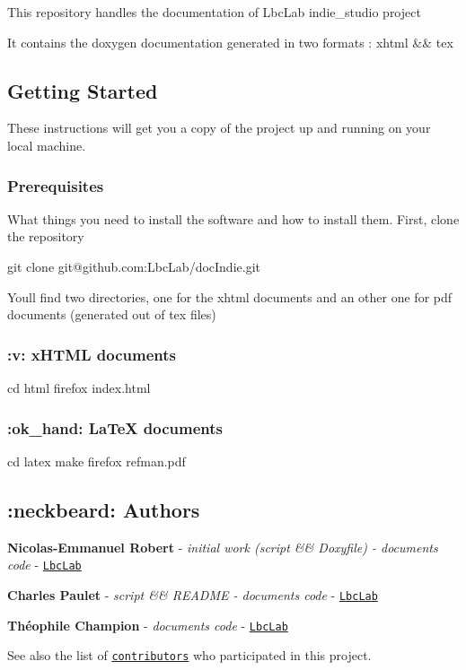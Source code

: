 This repository handles the documentation of Lbc\+Lab indie\+\_\+studio project

It contains the doxygen documentation generated in two formats \+: xhtml \&\& tex

\subsection*{Getting Started}

These instructions will get you a copy of the project up and running on your local machine.

\subsubsection*{Prerequisites}

What things you need to install the software and how to install them. First, clone the repository


\begin{DoxyCode}
git clone git@github.com:LbcLab/docIndie.git
\end{DoxyCode}


You\textquotesingle{}ll find two directories, one for the xhtml documents and an other one for pdf documents (generated out of tex files)

\subsubsection*{\+:v\+: x\+H\+T\+ML documents}


\begin{DoxyCode}
cd html
firefox index.html
\end{DoxyCode}


\subsubsection*{\+:ok\+\_\+hand\+: La\+TeX documents}


\begin{DoxyCode}
cd latex
make
firefox refman.pdf
\end{DoxyCode}


\subsection*{\+:neckbeard\+: Authors}


\begin{DoxyItemize}
\item {\bfseries Nicolas-\/\+Emmanuel Robert} -\/ {\itshape initial work (script \&\& Doxyfile) -\/ documents code} -\/ \href{https://lbclab.com/}{\tt Lbc\+Lab}
\item {\bfseries Charles Paulet} -\/ {\itshape script \&\& R\+E\+A\+D\+ME -\/ documents code} -\/ \href{https://lbclab.com/}{\tt Lbc\+Lab}
\item {\bfseries Théophile Champion} -\/ {\itshape documents code} -\/ \href{https://lbclab.com/}{\tt Lbc\+Lab}
\end{DoxyItemize}

See also the list of \href{https://github.com/LbcLab/docIndie/contributors}{\tt contributors} who participated in this project. 
